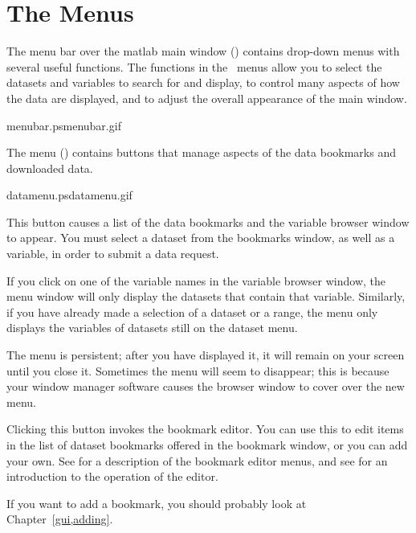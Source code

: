 \section{The Menus}

The menu bar over the matlab main window ()
contains drop-down menus with several useful functions.
The functions in the \GUI\ menus allow you to select the datasets and
variables to search for and display, to control many aspects of how
the data are displayed, and to adjust the overall appearance of the
main window.

%
{menubar.ps}{menubar.gif}{}


The  menu () contains buttons
that manage aspects of the data bookmarks and downloaded data.

{datamenu.ps}{datamenu.gif}{}


This button causes a list of the data bookmarks and the variable
browser window to appear.  You must select a dataset from the
bookmarks window, as well as a variable, in order to submit a data
request. 

If you click on one of the variable names in the variable browser
window, the  menu window will only display the
datasets that contain that variable.  Similarly, if you have already
made a selection of a dataset or a range, the  menu
only displays the variables of datasets still on the dataset menu.

The  menu is persistent; after you have displayed
it, it will remain on your screen until you close it. Sometimes the
menu will seem to disappear; this is because your window manager
software causes the browser window to cover over the new
 menu.


Clicking this button invokes the bookmark editor.  You can use this to
edit items in the list of dataset bookmarks offered in the bookmark
window, or you can add your own.  See 
for a description of the bookmark editor menus, and see
 for an introduction to the operation
of the editor.

If you want to add a bookmark, you should probably look at
Chapter~\ref{gui,adding}. 

